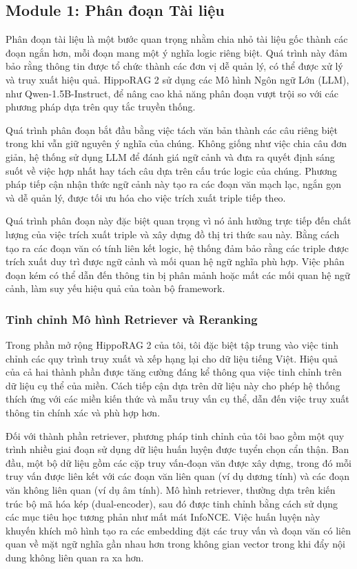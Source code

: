 \documentclass[../main.tex]{subfiles}
\begin{document}
\subsection{Module 1: Phân đoạn Tài liệu}
Phân đoạn tài liệu là một bước quan trọng nhằm chia nhỏ tài liệu gốc thành các đoạn ngắn hơn, mỗi đoạn mang một ý nghĩa logic riêng biệt. Quá trình này đảm bảo rằng thông tin được tổ chức thành các đơn vị dễ quản lý, có thể được xử lý và truy xuất hiệu quả. HippoRAG 2 sử dụng các Mô hình Ngôn ngữ Lớn (LLM), như Qwen-1.5B-Instruct, để nâng cao khả năng phân đoạn vượt trội so với các phương pháp dựa trên quy tắc truyền thống.

Quá trình phân đoạn bắt đầu bằng việc tách văn bản thành các câu riêng biệt trong khi vẫn giữ nguyên ý nghĩa của chúng. Không giống như việc chia câu đơn giản, hệ thống sử dụng LLM để đánh giá ngữ cảnh và đưa ra quyết định sáng suốt về việc hợp nhất hay tách câu dựa trên cấu trúc logic của chúng. Phương pháp tiếp cận nhận thức ngữ cảnh này tạo ra các đoạn văn mạch lạc, ngắn gọn và dễ quản lý, được tối ưu hóa cho việc trích xuất triple tiếp theo.

Quá trình phân đoạn này đặc biệt quan trọng vì nó ảnh hưởng trực tiếp đến chất lượng của việc trích xuất triple và xây dựng đồ thị tri thức sau này. Bằng cách tạo ra các đoạn văn có tính liên kết logic, hệ thống đảm bảo rằng các triple được trích xuất duy trì được ngữ cảnh và mối quan hệ ngữ nghĩa phù hợp. Việc phân đoạn kém có thể dẫn đến thông tin bị phân mảnh hoặc mất các mối quan hệ ngữ cảnh, làm suy yếu hiệu quả của toàn bộ framework.

\subsubsection{Tinh chỉnh Mô hình Retriever và Reranking}
Trong phần mở rộng HippoRAG 2 của tôi, tôi đặc biệt tập trung vào việc tinh chỉnh các quy trình truy xuất và xếp hạng lại cho dữ liệu tiếng Việt. Hiệu quả của cả hai thành phần được tăng cường đáng kể thông qua việc tinh chỉnh trên dữ liệu cụ thể của miền. Cách tiếp cận dựa trên dữ liệu này cho phép hệ thống thích ứng với các miền kiến thức và mẫu truy vấn cụ thể, dẫn đến việc truy xuất thông tin chính xác và phù hợp hơn.

Đối với thành phần retriever, phương pháp tinh chỉnh của tôi bao gồm một quy trình nhiều giai đoạn sử dụng dữ liệu huấn luyện được tuyển chọn cẩn thận. Ban đầu, một bộ dữ liệu gồm các cặp truy vấn-đoạn văn được xây dựng, trong đó mỗi truy vấn được liên kết với các đoạn văn liên quan (ví dụ dương tính) và các đoạn văn không liên quan (ví dụ âm tính). Mô hình retriever, thường dựa trên kiến trúc bộ mã hóa kép (dual-encoder), sau đó được tinh chỉnh bằng cách sử dụng các mục tiêu học tương phản như mất mát InfoNCE. Việc huấn luyện này khuyến khích mô hình tạo ra các embedding đặt các truy vấn và đoạn văn có liên quan về mặt ngữ nghĩa gần nhau hơn trong không gian vector trong khi đẩy nội dung không liên quan ra xa hơn.
\end{document}
